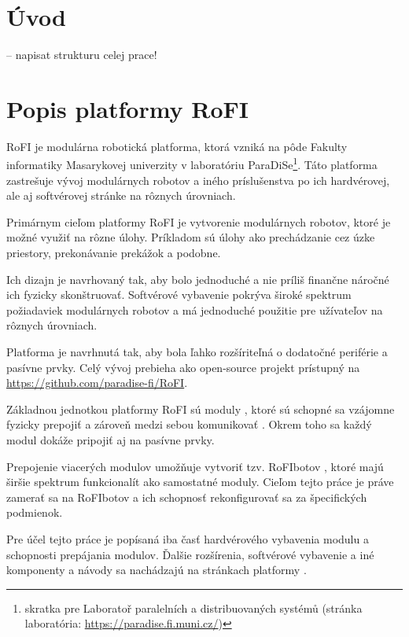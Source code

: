 \documentclass[
  digital, %
  oneside, %
  table,   %
  lof,     %
  nolot,     %
]{fithesis3}
\begin{document}
\chapter*{Úvod}
-- napisat strukturu celej prace!

\chapter{Popis platformy RoFI}
\label{sec:platform}
RoFI je modulárna robotická platforma, ktorá vzniká na pôde Fakulty informatiky Masarykovej univerzity v laboratóriu ParaDiSe\footnote{skratka pre Laboratoř paralelních a distribuovaných systémů (stránka laboratória: \url{https://paradise.fi.muni.cz/})}. Táto platforma zastrešuje vývoj modulárnych robotov a iného príslušenstva po ich hardvérovej, ale aj softvérovej stránke na rôznych úrovniach. 

Primárnym cieľom platformy RoFI je vytvorenie modulárnych robotov, ktoré je možné využiť na rôzne úlohy. Príkladom sú úlohy ako prechádzanie cez úzke priestory, prekonávanie prekážok a podobne. 

Ich dizajn je navrhovaný tak, aby bolo jednoduché a nie príliš finančne náročné ich fyzicky skonštruovať. Softvérové vybavenie pokrýva široké spektrum požiadaviek modulárnych robotov a má jednoduché použitie pre užívateľov na rôznych úrovniach. 

Platforma je navrhnutá tak, aby bola ľahko rozšíriteľná o dodatočné periférie a pasívne prvky. Celý vývoj prebieha ako open-source projekt prístupný na \url{https://github.com/paradise-fi/RoFI}.  

Základnou jednotkou platformy RoFI sú moduly \cite{mrazekMasterThesis}, ktoré sú schopné sa vzájomne fyzicky prepojiť a zároveň medzi sebou komunikovať \cite{rofiCom}. Okrem toho sa každý modul dokáže pripojiť aj na pasívne prvky. 

Prepojenie viacerých modulov umožňuje vytvoriť tzv. RoFIbotov \cite{rofiWeb}, ktoré majú širšie spektrum funkcionalít ako samostatné moduly. Cieľom tejto práce je práve zamerať sa na RoFIbotov a ich schopnosť rekonfigurovať sa za špecifických podmienok. 

Pre účel tejto práce je popísaná iba časť hardvérového vybavenia modulu a schopnosti prepájania modulov. Ďalšie rozšírenia, softvérové vybavenie a iné komponenty a návody sa nachádzajú na stránkach platformy \cite{rofiWeb}.
\end{document}
